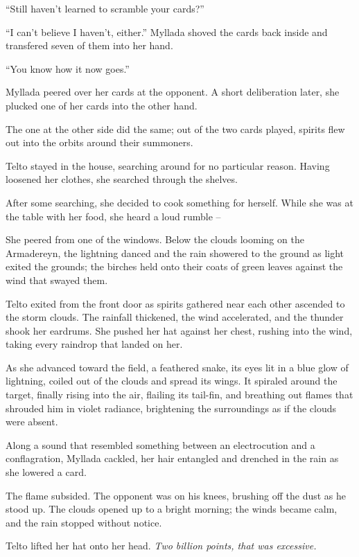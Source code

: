 ``Still haven't learned to scramble your cards?''

``I can't believe I haven't, either.'' Myllada shoved the cards back inside and transfered seven of them into her hand.

``You know how it now goes.''

Myllada peered over her cards at the opponent. A short deliberation later, she plucked one of her cards into the other hand.

The one at the other side did the same; out of the two cards played, spirits flew out into the orbits around their summoners.

\centeredstars

Telto stayed in the house, searching around for no particular reason. Having loosened her clothes, she searched through the shelves.

After some searching, she decided to cook something for herself. While she was at the table with her food, she heard a loud rumble --

She peered from one of the windows. Below the clouds looming on the Armadereyn, the lightning danced and the rain showered to the ground as light exited the grounds; the birches held onto their coats of green leaves against the wind that swayed them.

Telto exited from the front door as spirits gathered near each other ascended to the storm clouds. The rainfall thickened, the wind accelerated, and the thunder shook her eardrums. She pushed her hat against her chest, rushing into the wind, taking every raindrop that landed on her.

As she advanced toward the field, a feathered snake, its eyes lit in a blue glow of lightning, coiled out of the clouds and spread its wings. It spiraled around the target, finally rising into the air, flailing its tail-fin, and breathing out flames that shrouded him in violet radiance, brightening the surroundings as if the clouds were absent.

Along a sound that resembled something between an electrocution and a conflagration, Myllada cackled, her hair entangled and drenched in the rain as she lowered a card.

The flame subsided. The opponent was on his knees, brushing off the dust as he stood up. The clouds opened up to a bright morning; the winds became calm, and the rain stopped without notice.

Telto lifted her hat onto her head. \emph{Two billion points, that was excessive.}

